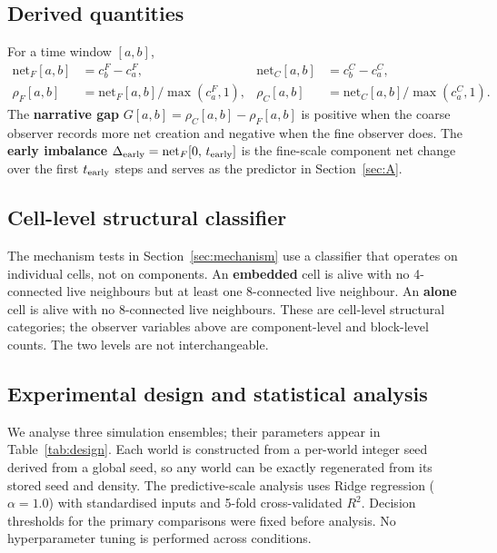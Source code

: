 \documentclass[11pt,a4paper]{article}
\newcommand{\Dearly}{\Delta_{\mathrm{early}}}
\newcommand{\rhoF}{\rho_F}
\newcommand{\rhoC}{\rho_C}
\newcommand{\netF}{\mathrm{net}_F}
\newcommand{\netC}{\mathrm{net}_C}
\begin{document}
\subsection{Derived quantities}

For a time window $[a,b]$,
\begin{align}
\netF[a,b] &= c^F_b - c^F_a, &
\netC[a,b] &= c^C_b - c^C_a, \\
\rhoF[a,b] &= \netF[a,b] / \max(c^F_a,1), &
\rhoC[a,b] &= \netC[a,b] / \max(c^C_a,1).
\end{align}
The \textbf{narrative gap} $G[a,b] = \rhoC[a,b] - \rhoF[a,b]$ is positive
when the coarse observer records more net creation and negative when the fine
observer does.
The \textbf{early imbalance} $\Dearly = \netF[0,\,t_{\rm early}]$ is the
fine-scale component net change over the first $t_{\rm early}$ steps and
serves as the predictor in Section~\ref{sec:A}.

\subsection{Cell-level structural classifier}

The mechanism tests in Section~\ref{sec:mechanism} use a classifier that
operates on individual cells, not on components.
An \textbf{embedded} cell is alive with no 4-connected live neighbours but
at least one 8-connected live neighbour.
An \textbf{alone} cell is alive with no 8-connected live neighbours.
These are cell-level structural categories; the observer variables above are
component-level and block-level counts.
The two levels are not interchangeable.

\subsection{Experimental design and statistical analysis}

We analyse three simulation ensembles; their parameters appear in
Table~\ref{tab:design}.
Each world is constructed from a per-world integer seed derived from a global
seed, so any world can be exactly regenerated from its stored seed and
density.
The predictive-scale analysis uses Ridge regression ($\alpha=1.0$) with
standardised inputs and 5-fold cross-validated $R^2$.
Decision thresholds for the primary comparisons were fixed before analysis.
No hyperparameter tuning is performed across conditions.
\end{document}
